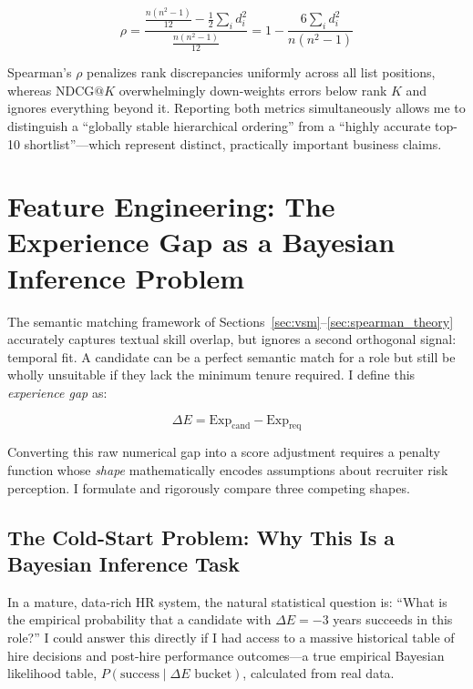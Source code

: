 \begin{equation}
\rho = \frac{\frac{n(n^2-1)}{12} - \frac{1}{2}\sum_i d_i^2}{\frac{n(n^2-1)}{12}} = 1 - \frac{6\sum_i d_i^2}{n(n^2-1)}
\label{eq:spearman_proof}
\end{equation}

Spearman's $\rho$ penalizes rank discrepancies uniformly across all list positions, whereas $\text{NDCG}@K$ overwhelmingly down-weights errors below rank $K$ and ignores everything beyond it. Reporting both metrics simultaneously allows me to distinguish a ``globally stable hierarchical ordering'' from a ``highly accurate top-10 shortlist''---which represent distinct, practically important business claims.

\section{Feature Engineering: The Experience Gap as a Bayesian Inference Problem}
\label{sec:deltaE_theory}

The semantic matching framework of Sections~\ref{sec:vsm}--\ref{sec:spearman_theory} accurately captures textual skill overlap, but ignores a second orthogonal signal: temporal fit. A candidate can be a perfect semantic match for a role but still be wholly unsuitable if they lack the minimum tenure required. I define this \emph{experience gap} as:

\begin{equation}
\Delta E = \text{Exp}_{\text{cand}} - \text{Exp}_{\text{req}}
\label{eq:delta_e_def}
\end{equation}

\vspace{0.5em}

Converting this raw numerical gap into a score adjustment requires a penalty function whose \emph{shape} mathematically encodes assumptions about recruiter risk perception. I formulate and rigorously compare three competing shapes.

\subsection{The Cold-Start Problem: Why This Is a Bayesian Inference Task}
\label{sec:cold_start}
\label{subsec:bayes_motivation}

In a mature, data-rich HR system, the natural statistical question is: ``What is the empirical probability that a candidate with $\Delta E = -3$ years succeeds in this role?'' I could answer this directly if I had access to a massive historical table of hire decisions and post-hire performance outcomes---a true empirical Bayesian likelihood table, $P(\text{success} \mid \Delta E\text{ bucket})$, calculated from real data.

